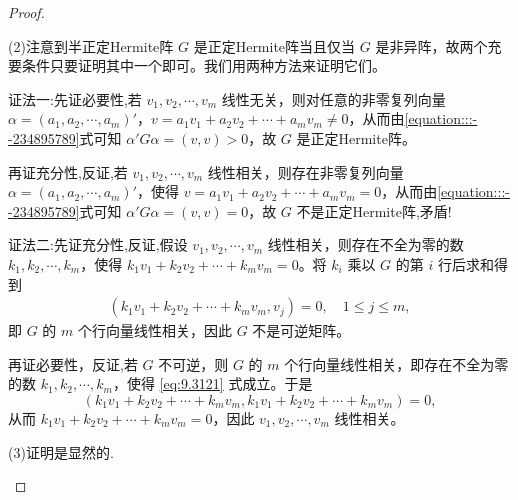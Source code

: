 \documentclass[../../main.tex]{subfiles}%
\begin{document}
\begin{proof}
\begin{enumerate}
(2)注意到半正定Hermite阵 $G$ 是正定Hermite阵当且仅当 $G$ 是非异阵，故两个充要条件只要证明其中一个即可。我们用两种方法来证明它们。

{\color{blue}证法一:}先证必要性,若 $v_1,v_2,\cdots,v_m$ 线性无关，则对任意的非零复列向量 $\alpha=(a_1,a_2,\cdots,a_m)'$，$v = a_1v_1 + a_2v_2 + \cdots + a_mv_m\neq0$，从而由\eqref{equation:::--234895789}式可知 $\alpha'G\alpha=(v,v)>0$，故 $G$ 是正定Hermite阵。

再证充分性,反证,若 $v_1,v_2,\cdots,v_m$ 线性相关，则存在非零复列向量 $\alpha=(a_1,a_2,\cdots,a_m)'$，使得 $v = a_1v_1 + a_2v_2 + \cdots + a_mv_m = 0$，从而由\eqref{equation:::--234895789}式可知 $\alpha'G\alpha=(v,v)=0$，故 $G$ 不是正定Hermite阵,矛盾!

{\color{blue}证法二:}先证充分性,反证,假设 $v_1,v_2,\cdots,v_m$ 线性相关，则存在不全为零的数 $k_1,k_2,\cdots,k_m$，使得 $k_1v_1 + k_2v_2 + \cdots + k_mv_m = 0$。将 $k_i$ 乘以 $G$ 的第 $i$ 行后求和得到
\begin{align}
(k_1v_1 + k_2v_2 + \cdots + k_mv_m,v_j)=0,\quad 1\leqslant  j\leqslant  m,\label{eq:9.3121}
\end{align}
即 $G$ 的 $m$ 个行向量线性相关，因此 $G$ 不是可逆矩阵。

再证必要性，反证,若 $G$ 不可逆，则 $G$ 的 $m$ 个行向量线性相关，即存在不全为零的数 $k_1,k_2,\cdots,k_m$，使得 \eqref{eq:9.3121} 式成立。于是
\[
(k_1v_1 + k_2v_2 + \cdots + k_mv_m,k_1v_1 + k_2v_2 + \cdots + k_mv_m)=0,
\]
从而 $k_1v_1 + k_2v_2 + \cdots + k_mv_m = 0$，因此 $v_1,v_2,\cdots,v_m$ 线性相关。

(3)证明是显然的.
\end{enumerate}
\end{proof}
\end{document}
